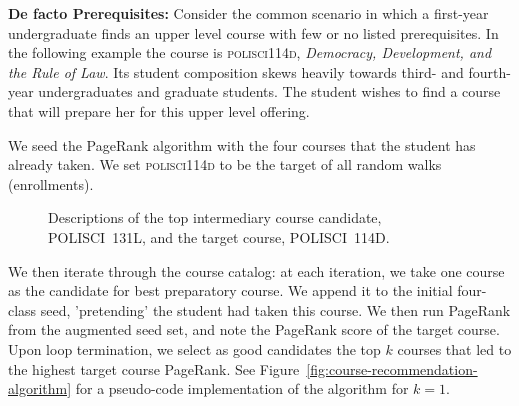 {\bf De facto Prerequisites:} Consider the common scenario in
which a first-year undergraduate finds an upper
level course with few or no listed prerequisites. In the following
example the course is \textsc{polisci114d}, {\em Democracy, Development, and
  the Rule of Law}. Its student composition skews heavily towards
third- and fourth- year undergraduates and graduate students. The
student wishes to find a course that will prepare her for this upper
level offering.

We seed the PageRank algorithm with the four courses that the student
has already taken. We set \textsc{polisci114d} to be the target of all random
walks (enrollments).

\begin{figure}
    \centering
    \noindent{}
    \noindent{}
    \caption{Descriptions of the top intermediary course candidate,
      POLISCI~131L, and the target course, POLISCI~114D.}
    \label{fig:pr-course-descriptions}
\end{figure}

We then iterate through the course catalog: at each iteration, we take
one course as the candidate for best preparatory course. We append it
to the initial four-class seed, 'pretending' the student had taken
this course. We then run PageRank from the augmented seed set, and
note the PageRank score of the target course. Upon loop termination,
we select as good candidates the top $k$ courses that led to the
highest target course PageRank.  See
Figure~\ref{fig:course-recommendation-algorithm} for a pseudo-code
implementation of the algorithm for $k=1$.

